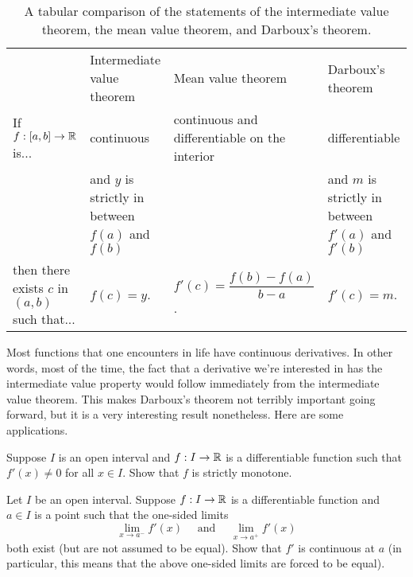 \begin{table}
	\begin{center}
		{\scriptsize 
			\begin{tabular}{ p{} p{0.23\textwidth} p{} p{} } 
				\toprule[1pt]
				& Intermediate value theorem & Mean value theorem & Darboux's theorem \\ \cmidrule{2-4}
				If $f : [a, b] \to \mathbb{R}$ is... & continuous & continuous and differentiable on the interior & differentiable \\ \addlinespace[1em]
				& and $y$ is strictly in between $f(a)$ and $f(b)$ & & and $m$ is strictly in between $f'(a)$ and $f'(b)$ \\ \addlinespace[1em]
				then there exists $c$ in $(a,b)$ such that... & $f(c) = y$. & $f'(c) = \dfrac{f(b) - f(a)}{b-a}$. & $f'(c) = m$. \\ \bottomrule[1pt]
		\end{tabular}}
	\end{center}
	\caption{A tabular comparison of the statements of the intermediate value theorem, the mean value theorem, and Darboux's theorem.} \label{ivt-mvt-darboux}
\end{table}

Most functions that one encounters in life have continuous derivatives. In other words, most of the time, the fact that a derivative we're interested in has the intermediate value property would follow immediately from the intermediate value theorem. This makes Darboux's theorem not terribly important going forward, but it is a very interesting result nonetheless. Here are some applications. 

\begin{exercise} \label{nonzero-derivative-implies-strictly-monotone}
	Suppose $I$ is an open interval and $f : I \to \mathbb{R}$ is a differentiable function such that $f'(x) \neq 0$ for all $x \in I$. Show that $f$ is strictly monotone.
\end{exercise}

\begin{exercise}
	Let $I$ be an open interval. Suppose $f : I \to \mathbb{R}$ is a differentiable function and $a \in I$ is a point such that the one-sided limits
	\[ \lim_{x \to a^-} f'(x) \quad\text{ and }\quad \lim_{x \to a^+} f'(x) \]
	both exist (but are not assumed to be equal). Show that $f'$ is continuous at $a$ (in particular, this means that the above one-sided limits are forced to be equal). 
\end{exercise}

